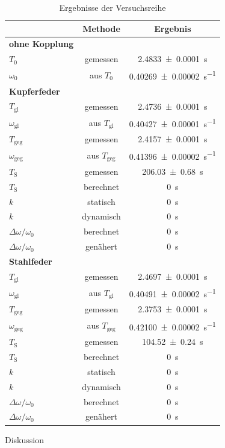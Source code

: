 \documentclass[11pt,a4paper,titlepage, ngerman]{article}
\begin{document}
			\begin{table}[ht]
				\caption{Ergebnisse der Versuchsreihe}
				\centering
				\label{tab:result}
				\begin{tabular}{l|S|S}
						& {Methode} & {Ergebnis}\\
					\hline
					{\textbf{ohne Kopplung}} & &\\
					{$T_0$} & {gemessen} & \SI{2,4833 +- 0,0001}{\second}\\
					{$\omega_0$} & {aus $T_0$} & \SI{0,40269 +- 0,00002}{\s^{-1}}\\
					\hline
					{\textbf{Kupferfeder}} & &\\
					{$T_\text{gl}$} & {gemessen} & \SI{2,4736 +- 0,0001}{\second}\\
					{$\omega_\text{gl}$} & {aus $T_\text{gl}$} & \SI{0,40427 +- 0,00001}{\s^{-1}}\\
					{$T_\text{geg}$} & {gemessen} & \SI{2,4157 +- 0,0001}{\second}\\
					{$\omega_\text{geg}$} & {aus $T_\text{geg}$} & \SI{0,41396 +- 0,00002}{\s^{-1}}\\
					{$T_\text{S}$} & {gemessen} & \SI{206,03 +-0,68}{\second}\\
					{$T_\text{S}$} & {berechnet} & \SI{0}{\second}\\
					{$k$} & {statisch} & \SI{0}{\second}\\
					{$k$} & {dynamisch} &\SI{0}{\second}\\
					{$\Delta\omega / \omega_0$} & {berechnet} & \SI{0}{\second}\\
					{$\Delta\omega / \omega_0$} & {genähert} & \SI{0}{\second}\\
					\hline
					{\textbf{Stahlfeder}} & &\\
					{$T_\text{gl}$} & {gemessen} & \SI{2,4697 +- 0,0001}{\second}\\
					{$\omega_\text{gl}$} & {aus $T_\text{gl}$} & \SI{0,40491 +- 0,00002}{\s^{-1}}\\
					{$T_\text{geg}$} & {gemessen} & \SI{2,3753 +- 0,0001}{\second}\\
					{$\omega_\text{geg}$} & {aus $T_\text{geg}$} & \SI{0,42100 +- 0,00002}{\s^{-1}}\\
					{$T_\text{S}$} & {gemessen} & \SI{104,52 +- 0,24}{\second}\\
					{$T_\text{S}$} & {berechnet} & \SI{0}{\second}\\
					{$k$} & {statisch} & \SI{0}{\second}\\
					{$k$} & {dynamisch} & \SI{0}{\second}\\
					{$\Delta\omega / \omega_0$} & {berechnet} & \SI{0}{\second}\\
					{$\Delta\omega / \omega_0$} & {genähert} & \SI{0}{\second}\\
				\end{tabular}
			\end{table}
			Diskussion
\end{document}
